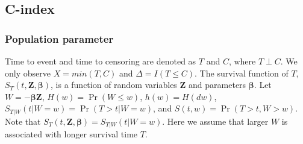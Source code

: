 \documentclass[]{article}\usepackage[]{graphicx}\usepackage[]{color}
\begin{document}
%
%
%
%
%




\subsection{C-index}

\subsubsection{Population parameter}

Time to event and time to censoring are denoted as $T$ and $C$, where $T \perp C$. We only observe $X = min(T, C)$ and $\Delta = I(T\leq C)$.  The survival function of $T$, $S_T(t,\pmb{Z}, \pmb{\beta})$, is a function of random variables $\pmb{Z}$ and parameters $\pmb{\beta}$. Let $W = -\pmb{\beta}\pmb{Z}$, $H(w) = \Pr(W \leq w)$, $h(w) = H(dw)$, $S_{T|W}(t|W=w) = \Pr(T>t|W = w)$,  and $S(t, w) = \Pr(T > t, W>w)$. Note that $S_T(t,\pmb{Z}, \pmb{\beta}) = S_{T|W}(t|W=w)$. Here we assume that larger $W$ is associated with longer survival time $T$.
\end{document}
